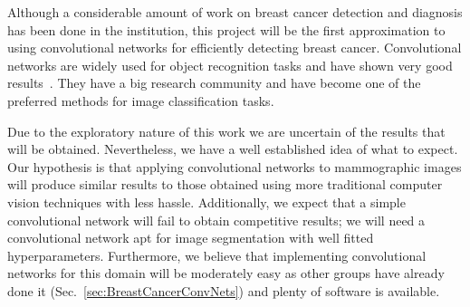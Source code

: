 Although a considerable amount of work on breast cancer detection and diagnosis has been done in the institution, this project will be the first approximation to using convolutional networks for efficiently detecting breast cancer. Convolutional networks are widely used for object recognition tasks and have shown very good results~\cite{Russakovsky2015, Taigman2014, Dieleman2015}. They have a big research community and have become one of the preferred methods for image classification tasks.

Due to the exploratory nature of this work we are uncertain of the results that will be obtained. Nevertheless, we have a well established idea of what to expect. Our hypothesis is that applying convolutional networks to mammographic images will produce similar results to those obtained using more traditional computer vision techniques with less hassle. Additionally, we expect that a simple convolutional network will fail to obtain competitive results; we will need a convolutional network apt for image segmentation with well fitted hyperparameters. Furthermore, we believe that implementing convolutional networks for this domain will be moderately easy as other groups have already done it (Sec.~\ref{sec:BreastCancerConvNets}) and plenty of software is available.

